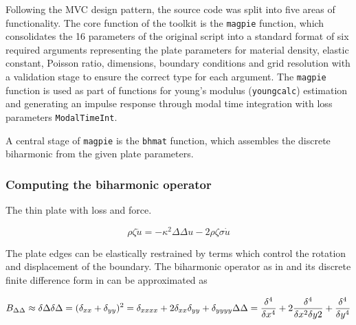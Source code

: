 
Following the MVC design pattern, the source code was split into five areas of functionality.
The core function of the toolkit is the \texttt{magpie} function, which consolidates the 16 parameters of the original script into a standard format of six required arguments representing the plate parameters for material density, elastic constant, Poisson ratio, dimensions, boundary conditions and grid resolution with a validation stage to ensure the correct type for each argument.
The \texttt{magpie} function is used as part of functions for young's modulus (\texttt{youngcalc}) estimation and generating an impulse response through modal time integration with loss parameters \texttt{ModalTimeInt}. 


A central stage of \texttt{magpie} is the \texttt{bhmat} function, which assembles the discrete biharmonic from the given plate parameters.

\subsubsection{Computing the biharmonic operator}

The thin plate \cites[][p. 331]{bilbao_numerical_2009}[][p. 233]{graff_wave_1991} with loss \cites[][p. 341]{bilbao_numerical_2009} and force.

\begin{equation}
\rho\zeta\ddot{u} = -\kappa^{2}\Delta\Delta u - 2 \rho\zeta\sigma\dot{u}
\end{equation}



The plate edges can be elastically restrained \cite{li_exact_2009} by terms which control the rotation and displacement of the boundary. The biharmonic operator as in \textcite[][p. 233]{graff_wave_1991} and its discrete finite difference form in \textcite[][p. 289]{bilbao_numerical_2009} can be approximated as 

\[
B_{\Delta\Delta} \approx \delta\Delta\delta\Delta = (\delta_{xx} + \delta_{yy})^{2} = \delta_{xxxx} + 2\delta_{xx}\delta_{yy} + \delta_{yyyy}\\
\Delta\Delta = \frac{\delta^4}{\delta x^4} + 2\frac{\delta^4}{\delta x^2 \delta y2} + \frac{\delta^4}{\delta y^4}
\]

